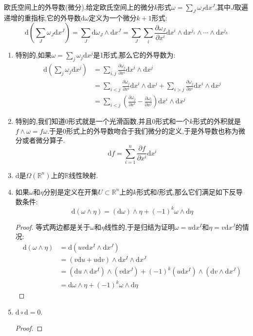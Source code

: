 欧氏空间上的外导数(微分).给定欧氏空间上的微分$k$形式$\omega=\sum_J\omega_J\mathrm{d}x^J$,其中$J$取遍递增的重指标,它的外导数$\mathrm{d}\omega$定义为一个微分$k+1$形式:
$$\mathrm{d}(\sum_J\omega_J\mathrm{d}x^J)=\sum_J\mathrm{d}\omega_J\wedge\mathrm{d}x^J=\sum_J\sum_i\frac{\partial\omega_J}{\partial x^i}\mathrm{d}x^i\wedge\mathrm{d}x^{j_1}\wedge\cdots\wedge\mathrm{d}x^{j_k}$$
\begin{enumerate}
	\item 特别的,如果$\omega=\sum_j\omega_j\mathrm{d}x^j$是1形式,那么它的外导数为:
	\begin{align*}
	\mathrm{d}(\sum_j\omega_j\mathrm{d}x^j)&=\sum_{i,j}\frac{\partial\omega_j}{\partial x^i}\mathrm{d}x^i\wedge\mathrm{d}x^j\\&=\sum_{i<j}\frac{\partial\omega_j}{\partial x^i}\mathrm{d}x^i\wedge\mathrm{d}x^j+\sum_{i>j}\frac{\partial\omega_j}{\partial x^i}\mathrm{d}x^i\wedge\mathrm{d}x^j\\&=\sum_{i<j}\left(\frac{\partial\omega_j}{\partial x^i}-\frac{\partial\omega_i}{\partial x^j}\right)\mathrm{d}x^i\wedge\mathrm{d}x^j
	\end{align*}
	\item 特别的,我们知道0形式就是一个光滑函数,并且0形式和一个$k$形式的外积就是$f\wedge\omega=f\omega$.于是0形式上的外导数吻合于我们微分的定义,于是外导数也称为微分或者微分算子.
	$$\mathrm{d}f=\sum_{i=1}^n\frac{\partial f}{\partial x^i}\mathrm{d}x^i$$
	\item $\mathrm{d}$是$\Omega(\mathbb{R}^n)$上的$\mathbb{R}$线性映射.
	\item 如果$\omega$和$\eta$分别是定义在开集$U\subset\mathbb{R}^n$上的$k$形式和$l$形式,那么它们满足如下反导数条件:
	$$\mathrm{d}(\omega\wedge\eta)=(\mathrm{d}\omega)\wedge\eta+(-1)^k\omega\wedge\mathrm{d}\eta$$
	\begin{proof}
		
		等式两边都是关于$\omega$和$\eta$线性的,于是归结为证明$\omega=u\mathrm{d}x^I$和$\eta=v\mathrm{d}x^J$的情况:
		\begin{align*}
		\mathrm{d}(\omega\wedge\eta)&=\mathrm{d}\left(uv\mathrm{d}x^I\wedge\mathrm{d}x^J\right)\\&=(v\mathrm{d}u+u\mathrm{d}v)\wedge\mathrm{d}x^I\wedge\mathrm{d}x^J\\&=(\mathrm{d}u\wedge\mathrm{d}x^I)\wedge(v\mathrm{d}x^J)+(-1)^k(u\mathrm{d}x^I)\wedge(\mathrm{d}v\wedge\mathrm{d}x^J)\\&=\mathrm{d}\omega\wedge\eta+(-1)^k\omega\wedge\mathrm{d}\eta
		\end{align*}
	\end{proof}
    \item $\mathrm{d}\circ\mathrm{d}=0$.
    \begin{proof}
    	

\end{proof}
\end{enumerate}

